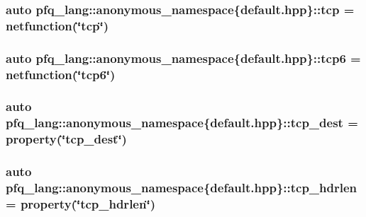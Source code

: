 \hypertarget{namespacepfq__lang_1_1anonymous__namespace_02default_8hpp_03_a4046140746c0012b4d1ea8d3ef53f084}{
\subsubsection[{tcp}]{\setlength{\rightskip}{0pt plus 5cm}auto pfq\-\_\-lang\-::anonymous\-\_\-namespace\{default.\-hpp\}\-::tcp = {\bf netfunction}(\char`\"{}tcp\char`\"{})}}\label{namespacepfq__lang_1_1anonymous__namespace_02default_8hpp_03_a4046140746c0012b4d1ea8d3ef53f084}
\hypertarget{namespacepfq__lang_1_1anonymous__namespace_02default_8hpp_03_a734af11014e5ccaef77d6fa39cea0d6b}{
\subsubsection[{tcp6}]{\setlength{\rightskip}{0pt plus 5cm}auto pfq\-\_\-lang\-::anonymous\-\_\-namespace\{default.\-hpp\}\-::tcp6 = {\bf netfunction}(\char`\"{}tcp6\char`\"{})}}\label{namespacepfq__lang_1_1anonymous__namespace_02default_8hpp_03_a734af11014e5ccaef77d6fa39cea0d6b}
\hypertarget{namespacepfq__lang_1_1anonymous__namespace_02default_8hpp_03_a3123415d88452c599055bf8eaba2211e}{
\subsubsection[{tcp\-\_\-dest}]{\setlength{\rightskip}{0pt plus 5cm}auto pfq\-\_\-lang\-::anonymous\-\_\-namespace\{default.\-hpp\}\-::tcp\-\_\-dest = {\bf property}(\char`\"{}tcp\-\_\-dest\char`\"{})}}\label{namespacepfq__lang_1_1anonymous__namespace_02default_8hpp_03_a3123415d88452c599055bf8eaba2211e}
\hypertarget{namespacepfq__lang_1_1anonymous__namespace_02default_8hpp_03_aa8e6b2154ad12220fd1f348c37eaa621}{
\subsubsection[{tcp\-\_\-hdrlen}]{\setlength{\rightskip}{0pt plus 5cm}auto pfq\-\_\-lang\-::anonymous\-\_\-namespace\{default.\-hpp\}\-::tcp\-\_\-hdrlen = {\bf property}(\char`\"{}tcp\-\_\-hdrlen\char`\"{})}}\label{namespacepfq__lang_1_1anonymous__namespace_02default_8hpp_03_aa8e6b2154ad12220fd1f348c37eaa621}
